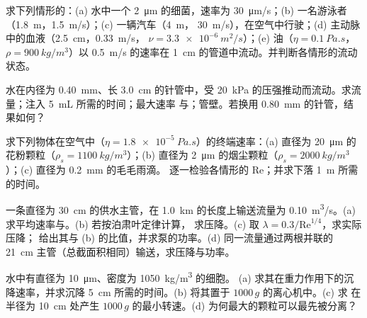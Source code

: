 \begin{exercise}[$\star$]\label{exo:b2:viscous-flows:2}
求下列情形的：(a) 水中一个 \qty{2}{\micro m} 的细菌，速率为 
\qty{30}{\micro m/s}；(b) 一名游泳者（\qty{1.8}{m}，\qty{1.5}{m/s}）；(c) 一辆汽车（\qty{4}{m}，
\qty{30}{m/s}），在空气中行驶；(d) 主动脉中的血液（\qty{2.5}{cm}，\qty{0.33}{m/s}，
$\nu = \qty{3.3e-6}{m^2/s}$）；(e) 油（$\eta = \qty{0.1}{Pa.s}$，$\rho =
\qty{900}{kg/m^3}$）以 \qty{0.5}{m/s} 的速率在 \qty{1}{cm} 的管道中流动。并判断各情形的流动状态。
\end{exercise}

\begin{exercise}[$\star$]\label{exo:b2:viscous-flows:3}
水在内径为 \qty{0.40}{mm}、长 \qty{3.0}{cm} 的针管中，受 
\qty{20}{kPa} 的压强推动而流动。求流量；注入 \qty{5}{mL} 所需的时间；最大速率
与；管壁。若换用 \qty{0.80}{mm} 的针管，结果如何？
\end{exercise}

\begin{exercise}[$\star$]\label{exo:b2:viscous-flows:4}
求下列物体在空气中（$\eta = \qty{1.8e-5}{Pa.s}$）的终端速率：(a) 直径为 \qty{20}{\micro m} 
的花粉颗粒（$\rho_s = \qty{1100}{kg/m^3}$）；(b) 直径为 \qty{2}{\micro m} 
的烟尘颗粒（$\rho_s = \qty{2000}{kg/m^3}$）；(c) 直径为 \qty{0.2}{mm} 的毛毛雨滴。
逐一检验各情形的 $\mathrm{Re}$；并求下落 \qty{1}{m} 所需的时间。
\end{exercise}

\begin{exercise}[$\star\star$]\label{exo:b2:viscous-flows:5}
一条直径为 \qty{30}{cm} 的供水主管，在 
\qty{1.0}{km} 的长度上输送流量为 \qty{0.10}{m^3/s}。(a) 求平均速率与。(b) 若按泊肃叶定律计算，
求压降。(c) 取 $\lambda = 0.3/\mathrm{Re}^{1/4}$，求实际压降；
给出其与 (b) 的比值，并求泵的功率。(d) 同一流量通过两根并联的 
\qty{21}{cm} 主管（总截面积相同）输送，求压降与功率。
\end{exercise}

\begin{exercise}[$\star\star$]\label{exo:b2:viscous-flows:6}
水中有直径为 \qty{10}{\micro m}、密度为 \qty{1050}{kg/m^3} 的细胞。
(a) 求其在重力作用下的沉降速率，并求沉降 \qty{5}{cm} 所需的时间。(b) 将其置于 
$1000\,g$ 的离心机中。(c) 求
在半径为 \qty{10}{cm} 处产生 $1000\,g$ 的最小转速。(d) 为何最大的颗粒可以最先被分离？
\end{exercise}

